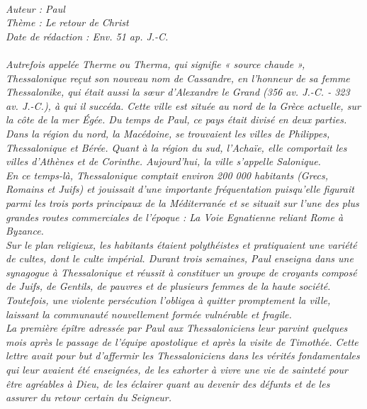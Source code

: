 \BFont
\noindent\hrulefill
{\footnotesize
\textit{
\bigskip
{\centering{}
\\Auteur : Paul
\\Thème : Le retour de Christ
\\Date de rédaction : Env. 51 ap. J.-C.\\}
}
\textit{
\\Autrefois appelée Therme ou Therma, qui signifie « source chaude », Thessalonique reçut son nouveau nom de Cassandre, en l'honneur de sa femme Thessalonike, qui était aussi la sœur d'Alexandre le Grand (356 av. J.-C. - 323 av. J.-C.), à qui il succéda. Cette ville est située au nord de la Grèce actuelle, sur la côte de la mer Égée. Du temps de Paul, ce pays était divisé en deux parties. Dans la région du nord, la Macédoine, se trouvaient les villes de Philippes, Thessalonique et Bérée. Quant à la région du sud, l'Achaïe, elle comportait les villes d'Athènes et de Corinthe. Aujourd'hui, la ville s'appelle Salonique.
\\En ce temps-là, Thessalonique comptait environ 200 000 habitants (Grecs, Romains et Juifs) et jouissait d'une importante fréquentation puisqu'elle figurait parmi les trois ports principaux de la Méditerranée et se situait sur l'une des plus grandes routes commerciales de l'époque : La Voie Egnatienne reliant Rome à Byzance.
\\Sur le plan religieux, les habitants étaient polythéistes et pratiquaient une variété de cultes, dont le culte impérial. Durant trois semaines, Paul enseigna dans une synagogue à Thessalonique et réussit à constituer un groupe de croyants composé de Juifs, de Gentils, de pauvres et de plusieurs femmes de la haute société. Toutefois, une violente persécution l'obligea à quitter promptement la ville, laissant la communauté nouvellement formée vulnérable et fragile.
\\La première épître adressée par Paul aux Thessaloniciens leur parvint quelques mois après le passage de l'équipe apostolique et après la visite de Timothée. Cette lettre avait pour but d'affermir les Thessaloniciens dans les vérités fondamentales qui leur avaient été enseignées, de les exhorter à vivre une vie de sainteté pour être agréables à Dieu, de les éclairer quant au devenir des défunts et de les assurer du retour certain du Seigneur.\bigskip
}
}
\par\nobreak\noindent\hrulefill
